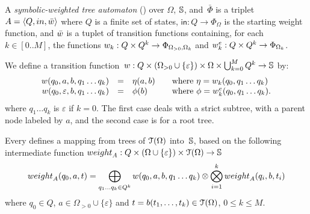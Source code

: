 %
\begin{definition}  \label{def:SWTA}
A \emph{symbolic-weighted tree automaton} (\SWTA)
over $\Omega$, $\mathbb{S}$, and~$\bar\Phi$
is a triplet $A = \< Q, \init, \bar{\wei} >$ where
$Q$ is a finite set of states,
$\mathsf{in} : Q \to \Phi_\Omega$ is the starting weight function,
and $\bar{\wei}$ is a tuplet of transition functions containing,
for each $k \in [0..M]$,
the functions $\wei_{k}: Q \times Q^{k} \to \Phi_{\Omega_{>0},\Omega_k}$
and $\weie[k]: Q \times Q^{k} \to \Phi_{\Omega_k}$.
\end{definition}
%
We define %
a transition
function~$\wei: Q \times (\Omega_{> 0} \cup \{ \varepsilon \}) \times \Omega \times \bigcup_{k=0}^{M} Q^k
  \to \Semiring$
by: %
\[
\begin{array}{rcll}
\wei(q_0, a, b, q_1 \ldots q_k) & = & \eta(a, b) &
\quad\mathrm{where~} \eta = \wei_{k}(q_0, q_1\ldots q_k)\\
\wei(q_0, \varepsilon, b, q_1 \ldots q_k) & = & \phi(b) &
\quad\mathrm{where~} \phi = \weie[k](q_0, q_1\ldots q_k).
\end{array}
\]
%
\noindent
where $q_1\ldots q_k$ is $\varepsilon$ if $k = 0$.
The first case deals with a strict subtree, with a parent node labeled by $a$,
and the second case is for a root tree.

\noindent
Every \SWTA %
defines a mapping
from trees of $\mathcal{T}(\Omega)$ into~$\mathbb{S}$, %
based on the following intermediate function
$\weight_A: Q \times (\Omega \cup \{ \varepsilon \}) \times \T(\Omega) \to \Semiring$
\begin{equation}
\weight_A(q_0, a, t) =  %
 \displaystyle\bigoplus_{q_1 \ldots q_k \in Q^k} %
              \wei(q_0, a, b, q_1 \ldots q_k )
   \otimes \displaystyle\bigotimes_{i=1}^{k}
           \weight_A(q_i, b, t_i)
\end{equation}
where $q_0 \in Q$, $a \in \Omega_{>0} \cup \{ \varepsilon \}$ and
$t = b(t_1,\ldots, t_k) \in \mathcal{T}(\Omega)$,
$0 \leq k \leq M$.

